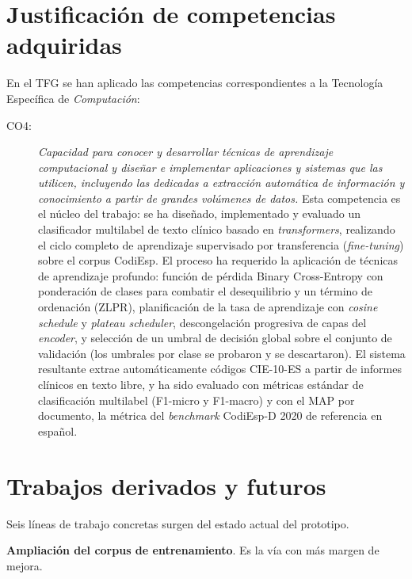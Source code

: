 \section{Justificación de competencias adquiridas}

En el TFG se han aplicado las competencias correspondientes a la Tecnología Específica de \emph{Computación}:

\begin{description}
 \item[CO4:] \emph{Capacidad para conocer y desarrollar técnicas de aprendizaje computacional y diseñar e implementar aplicaciones y sistemas que las utilicen, incluyendo las dedicadas a extracción automática de información y conocimiento a partir de grandes volúmenes de datos.} Esta competencia es el núcleo del trabajo: se ha diseñado, implementado y evaluado un clasificador multilabel de texto clínico basado en \emph{transformers}, realizando el ciclo completo de aprendizaje supervisado por transferencia (\emph{fine-tuning}) sobre el corpus CodiEsp. El proceso ha requerido la aplicación de técnicas de aprendizaje profundo: función de pérdida Binary Cross-Entropy con ponderación de clases para combatir el desequilibrio y un término de ordenación (ZLPR), planificación de la tasa de aprendizaje con \emph{cosine schedule} y \emph{plateau scheduler}, descongelación progresiva de capas del \emph{encoder}, y selección de un umbral de decisión global sobre el conjunto de validación (los umbrales por clase se probaron y se descartaron). El sistema resultante extrae automáticamente códigos CIE-10-ES a partir de informes clínicos en texto libre, y ha sido evaluado con métricas estándar de clasificación multilabel (F1-micro y F1-macro) y con el MAP por documento, la métrica del \emph{benchmark} CodiEsp-D 2020 de referencia en español.
\end{description}

\section{Trabajos derivados y futuros}

Seis líneas de trabajo concretas surgen del estado actual del prototipo.

\textbf{Ampliación del corpus de entrenamiento}. Es la vía con más margen de mejora.

